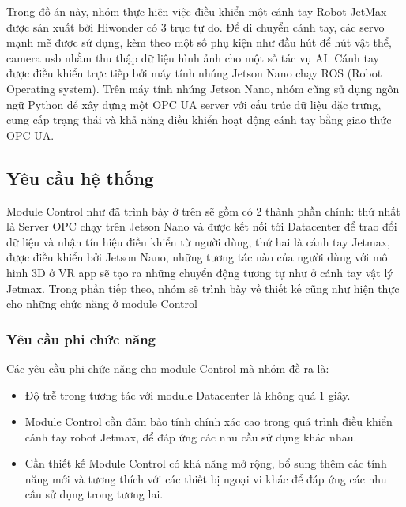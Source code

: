 Trong đồ án này, nhóm thực hiện việc điều khiển một cánh tay Robot JetMax được sản xuất bởi Hiwonder có 3 trục tự do. Để di chuyển cánh tay, các servo mạnh mẽ được sử dụng, kèm theo một số phụ kiện như đầu hút để hút vật thể, camera usb nhằm thu thập dữ liệu hình ảnh cho một số tác vụ AI. Cánh tay được điều khiển trực tiếp bởi máy tính nhúng Jetson Nano chạy ROS (Robot Operating system). Trên máy tính nhúng Jetson Nano, nhóm cũng sử dụng ngôn ngữ Python để xây dựng một OPC UA server với cấu trúc dữ liệu đặc trưng, cung cấp trạng thái và khả năng điều khiển hoạt động cánh tay bằng giao thức OPC UA.

\subsection{Yêu cầu hệ thống}


Module Control như đã trình bày ở trên sẽ gồm có 2 thành phần chính: thứ nhất là Server OPC chạy trên Jetson Nano và được kết nối tới Datacenter để trao đổi dữ liệu và nhận tín hiệu điều khiển từ người dùng, thứ hai là cánh tay Jetmax, được điều khiển bởi Jetson Nano, những tương tác nào của người dùng với mô hình 3D ở VR app sẽ tạo ra những chuyển động tương tự như ở cánh tay vật lý Jetmax. Trong phần tiếp theo, nhóm sẽ trình bày về thiết kế cũng như hiện thực cho những chức năng ở module Control
\subsubsection{Yêu cầu phi chức năng}
Các yêu cầu phi chức năng cho module Control mà nhóm đề ra là:
\begin{itemize}
    \item Độ trễ trong tương tác với module Datacenter là không quá 1 giây.
    \item Module Control cần đảm bảo tính chính xác cao trong quá trình điều khiển cánh tay robot Jetmax, để đáp ứng các nhu cầu sử dụng khác nhau.
    \item Cần thiết kế Module Control có khả năng mở rộng, bổ sung thêm các tính năng mới và tương thích với các thiết bị ngoại vi khác để đáp ứng các nhu cầu sử dụng trong tương lai.
\end{itemize}
